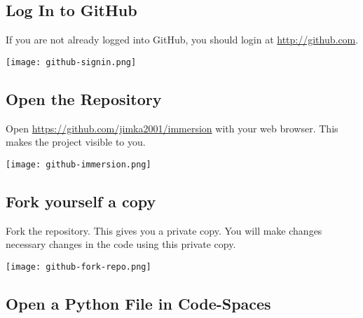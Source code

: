 \subsection{Log In to GitHub}
\label{sec.github.login}

If you are not already logged into GitHub, you should login at \url{http://github.com}.

\noindent\texttt{[image: github-signin.png]}


\clearpage
\subsection{Open the Repository}
\label{sec.open.repo}
  


Open \url{https://github.com/jimka2001/immersion} with your web browser.  This makes the project visible to you.

\noindent\texttt{[image: github-immersion.png]}


\subsection{Fork yourself a copy}

Fork the repository.  This gives you a private copy.  You will make changes
necessary changes in the code using this private copy.

\noindent \texttt{[image: github-fork-repo.png]}



\subsection{Open a Python File in Code-Spaces}
  
